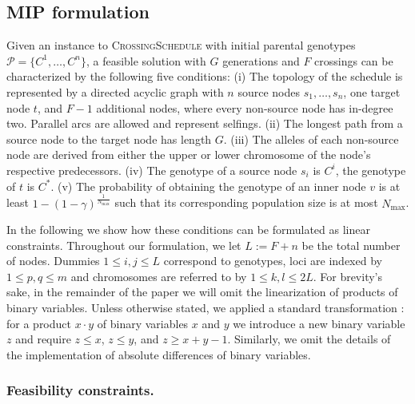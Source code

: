 \documentclass[runningheads]{llncs}
\begin{document}
\subsection{MIP formulation}
\label{sec:ilp}
Given an instance to \textsc{CrossingSchedule} with initial parental genotypes $\mathcal{P}=\{C^1,\dots,C^n\}$, a feasible solution with $G$ generations and $F$ crossings can be characterized by the following five conditions: (i) The topology of the schedule is represented by a directed acyclic graph with $n$ source nodes $s_1,\dots, s_n$, one target node $t$, and $F-1$ additional nodes, where every non-source node has in-degree two. Parallel arcs are allowed and represent selfings. (ii) The longest path from a source node to the target node has length $G$. (iii) The alleles of each non-source node are derived from either the upper or lower chromosome of the node's respective predecessors. (iv) The genotype of a source node $s_i$ is $C^i$, the genotype of $t$ is $C^*$. (v) The probability of obtaining the genotype of an inner node $v$ is at least $1 - (1 - \gamma)^\frac{1}{N_\mathrm{max}}$ such that its corresponding population size is at most $N_\mathrm{max}$.

In the following we show how these conditions can be formulated as linear constraints. Throughout our formulation, we let $L:=F+n$ be the total 
number of nodes. Dummies $1 \leq i,j \leq L$ correspond to genotypes, loci are indexed by $1 \leq p,q \leq m$ and chromosomes are referred to by $1 \leq k,l \leq 2L$. For brevity's sake, in the remainder of the paper we will omit the linearization of products of binary variables. Unless otherwise stated, we applied a standard transformation \cite{Bradley:1977}: for a product $x\cdot y$ of binary variables $x$ and $y$ we introduce a new binary variable $z$ and require $z\leq x$, $z\leq y$, and $z\geq x+y-1$.
Similarly, we omit the details of the implementation of absolute differences of binary variables.

\subsubsection{Feasibility constraints.}
\label{sec:feasibility}
\end{document}
